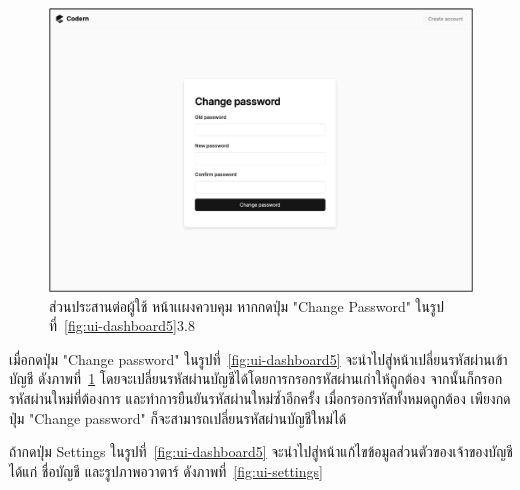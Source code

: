 \documentclass[12pt,oneside,openright,a4paper]{cpe-thai-project}
\begin{document}
    \hypertarget{ui-settings-password}{
        \begin{figure}[H]
        \centering
            \includegraphics[width=15cm]{figure/ui/ui-settings-password.png}
            \caption[ส่วนประสานต่อผู้ใช้ หน้าเเผงควบคุม (6)]{ส่วนประสานต่อผู้ใช้ หน้าเเผงควบคุม หากกดปุ่ม "Change Password" ในรูปที่~\ref{fig:ui-dashboard5}{3.8}}
            \label{fig:ui-settings-password}
        \end{figure}
    }
    \begin{flushleft}
    เมื่อกดปุ่ม "Change password" ในรูปที่~\ref{fig:ui-dashboard5} จะนำไปสู่หน้าเปลี่ยนรหัสผ่านเข้าบัญชี ดังภาพที่~\ref{fig:ui-settings-password} โดยจะเปลี่ยนรหัสผ่านบัญชีได้โดยการกรอกรหัสผ่านเก่าให้ถูกต้อง จากนั้นก็กรอกรหัสผ่านใหม่ที่ต้องการ และทำการยืนยันรหัสผ่านใหม่ซ้ำอีกครั้ง เมื่อกรอกรหัสทั้งหมดถูกต้อง เพียงกดปุ่ม "Change password" ก็จะสามารถเปลี่ยนรหัสผ่านบัญชีใหม่ได้
    \end{flushleft}

    \begin{flushleft}
    ถ้ากดปุ่ม Settings ในรูปที่~\ref{fig:ui-dashboard5} จะนำไปสู่หน้าแก้ไขข้อมูลส่วนตัวของเจ้าของบัญชี ได้แก่ ชื่อบัญชี และรูปภาพอวาตาร์ ดังภาพที่~\ref{fig:ui-settings}
    \end{flushleft}
\end{document}
